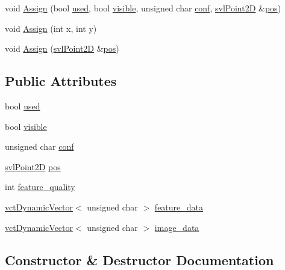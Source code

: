 \begin{DoxyCompactItemize}
\item 
void \hyperlink{structsvl_target2_d_a58853a145d50714d74192ad3ab15252c}{Assign} (bool \hyperlink{structsvl_target2_d_a74896ef54f0cdc80faaee2a7321635bc}{used}, bool \hyperlink{structsvl_target2_d_a90567161b27a6a1c1a8d1bd15c108d63}{visible}, unsigned char \hyperlink{structsvl_target2_d_adae08264a579759ab62b38ba347dc196}{conf}, \hyperlink{structsvl_point2_d}{svl\+Point2\+D} \&\hyperlink{structsvl_target2_d_ab68be6f073df6ae78c134a2515873b6c}{pos})
\item 
void \hyperlink{structsvl_target2_d_a87f4b1451255b0aa8dc1e75e74769383}{Assign} (int x, int y)
\item 
void \hyperlink{structsvl_target2_d_a3c5c8eab6595a614e8d3d00a28b89c2e}{Assign} (\hyperlink{structsvl_point2_d}{svl\+Point2\+D} \&\hyperlink{structsvl_target2_d_ab68be6f073df6ae78c134a2515873b6c}{pos})
\end{DoxyCompactItemize}
\subsection*{Public Attributes}
\begin{DoxyCompactItemize}
\item 
bool \hyperlink{structsvl_target2_d_a74896ef54f0cdc80faaee2a7321635bc}{used}
\item 
bool \hyperlink{structsvl_target2_d_a90567161b27a6a1c1a8d1bd15c108d63}{visible}
\item 
unsigned char \hyperlink{structsvl_target2_d_adae08264a579759ab62b38ba347dc196}{conf}
\item 
\hyperlink{structsvl_point2_d}{svl\+Point2\+D} \hyperlink{structsvl_target2_d_ab68be6f073df6ae78c134a2515873b6c}{pos}
\item 
int \hyperlink{structsvl_target2_d_a3eaf1d73276713940d630435ef04ff8f}{feature\+\_\+quality}
\item 
\hyperlink{classvct_dynamic_vector}{vct\+Dynamic\+Vector}$<$ unsigned char $>$ \hyperlink{structsvl_target2_d_a4450e7da880415189fd3f0714cf18ca5}{feature\+\_\+data}
\item 
\hyperlink{classvct_dynamic_vector}{vct\+Dynamic\+Vector}$<$ unsigned char $>$ \hyperlink{structsvl_target2_d_a26ffc8da663569e7a52982446600a476}{image\+\_\+data}
\end{DoxyCompactItemize}


\subsection{Constructor \& Destructor Documentation}
\hypertarget{structsvl_target2_d_ae8f0d611fa66af1f6a157fec39503855}{}
